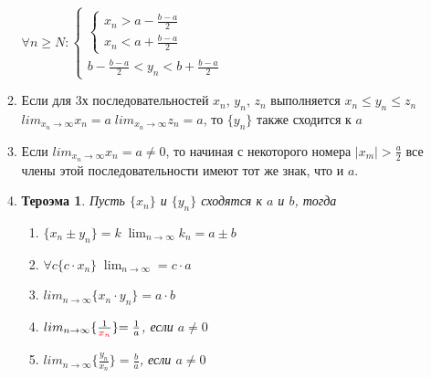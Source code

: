 \documentclass[oneside]{book}
\newtheorem{thm}{Тероэма}[chapter] %
\begin{document}
\begin{enumerate}
\begin{enumerate}
\begin{center}
            $\forall n \geq N: \begin{cases}
                \begin{cases}
                    x_n > a - \frac{b-a}{2} \\
                    x_n < a + \frac{b-a}{2}
                \end{cases} \\
                b - \frac{b-a}{2} < y_n < b + \frac{b-a}{2}
            \end{cases}$
          \end{center}
    \item Если для 3х последовательностей ${x_n}$, ${y_n}$, ${z_n}$ выполняется $x_n \leq y_n \leq z_n$
          $lim_{x_n \rightarrow \infty}{x_n = a}\; lim_{x_n \rightarrow \infty}{z_n = a}$, то $\{y_n\}$ также сходится к $a$
    \item Если $lim_{x_n \rightarrow \infty}{x_n = a \neq 0}$, то начиная с некоторого номера $|x_m| >
          \frac{a}{2}$ все члены этой последовательности имеют тот же знак, что и $a$.
    \item \begin{thm}
        Пусть $\{x_n\}$ и $\{y_n\}$ сходятся к $a$ и $b$, тогда \begin{enumerate}
            \item $\{x_n \pm y_n\} = k\; \lim_{n \rightarrow \infty}{k_n = a \pm b}$
            \item $\forall c \{c \cdot x_n\}\; \lim_{n \rightarrow \infty}{= c \cdot a}$
            \item $lim_{n \rightarrow \infty}{\{x_n \cdot y_n\} = a \cdot b}$
            \item $lim_{n \rightarrow \infty}\{{\frac{1}{\textcolor{red}{x_n}}\}{= \frac{1}{a}}}$, если $a \neq 0$
            \item $lim_{n \rightarrow \infty}{\{{\frac{y_n}{x_n}}\}= \frac{b}{a}}$, если $a \neq 0$
        \end{enumerate}
    \end{thm}
\end{enumerate}


\end{enumerate}
\end{document}
